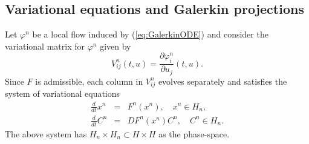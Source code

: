 \subsection{Variational equations and Galerkin projections}
%
%
%
%

Let $\varphi^n$ be a local flow induced by (\ref{eq:GalerkinODE}) and consider the variational matrix for $\varphi^n$ given by
\begin{equation*}
  V^n_{ij}(t,u)= \frac{\partial \varphi^n_i}{\partial u_j} (t,u).
\end{equation*}
Since $F$ is admissible, each column in $V^{n}_{ij}$ evolves separately and satisfies the system of variational equations
\begin{eqnarray}
  \frac{d}{dt} x^n &=& F^n(x^n), \quad x^n \in H_n,  \label{eq:sysVar1} \\
  \frac{d}{dt} C^n &=& D F^n(x^n) C^n, \quad C^n \in H_n. \label{eq:sysVar2}
\end{eqnarray}
The above system has $H_n \times H_n \subset H \times H$ as the phase-space.


